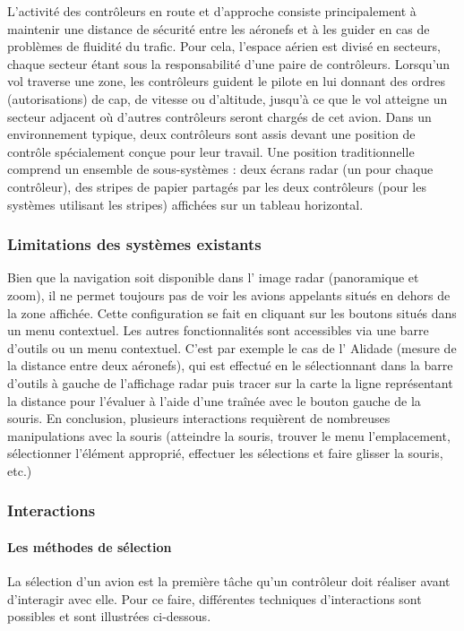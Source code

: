 L’activité des contrôleurs en route et d’approche consiste principalement à maintenir une distance de sécurité entre les aéronefs et à les guider en cas de problèmes de fluidité du trafic. Pour cela, l’espace aérien est divisé en secteurs, chaque secteur étant sous la responsabilité d’une paire de contrôleurs. Lorsqu'un vol traverse une zone, les contrôleurs guident
le pilote en lui donnant des ordres (autorisations) de cap, de vitesse ou d’altitude, jusqu’à ce que le vol atteigne un secteur adjacent où d’autres contrôleurs seront chargés de cet avion. Dans un environnement typique, deux contrôleurs sont assis devant une position de contrôle spécialement conçue pour leur travail. Une position traditionnelle comprend un ensemble de sous-systèmes : deux écrans radar (un pour chaque contrôleur), des stripes de papier partagés par les deux contrôleurs (pour les systèmes utilisant les stripes) affichées sur un tableau horizontal.

\subsubsection{Limitations des systèmes existants}
Bien que la navigation soit disponible dans l'
image radar (panoramique et zoom), il ne permet toujours pas de voir les avions appelants situés en dehors de la zone affichée. Cette
configuration se fait en cliquant sur les boutons situés
dans un menu contextuel. Les autres fonctionnalités sont accessibles via une barre d'outils
ou un menu contextuel. C’est par exemple le cas de l'
Alidade (mesure de la distance entre deux aéronefs), qui
est effectué en le sélectionnant dans la barre d’outils à gauche de l'affichage radar puis tracer sur la carte la ligne
représentant la distance pour l'évaluer  à l'aide d'une traînée
avec le bouton gauche de la souris.
En conclusion, plusieurs interactions requièrent de nombreuses manipulations avec la souris (atteindre la souris, trouver le menu
l'emplacement, sélectionner l'élément approprié, effectuer les sélections et faire glisser la souris, etc.)

\subsubsection{Interactions}
\paragraph{Les méthodes de sélection}
La sélection d'un avion est la première tâche qu'un contrôleur doit réaliser avant d'interagir avec elle. Pour ce faire, différentes techniques d'interactions sont possibles et sont illustrées ci-dessous.

